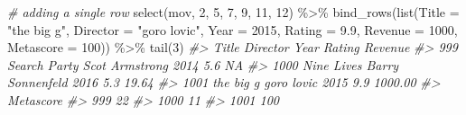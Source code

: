 \documentclass[
]{book}
\newenvironment{Shaded}{\begin{snugshade}}{\end{snugshade}}
\newcommand{\AttributeTok}[1]{\textcolor[rgb]{0.77,0.63,0.00}{#1}}
\newcommand{\CommentTok}[1]{\textcolor[rgb]{0.56,0.35,0.01}{\textit{#1}}}
\newcommand{\DecValTok}[1]{\textcolor[rgb]{0.00,0.00,0.81}{#1}}
\newcommand{\FloatTok}[1]{\textcolor[rgb]{0.00,0.00,0.81}{#1}}
\newcommand{\FunctionTok}[1]{\textcolor[rgb]{0.00,0.00,0.00}{#1}}
\newcommand{\NormalTok}[1]{#1}
\newcommand{\SpecialCharTok}[1]{\textcolor[rgb]{0.00,0.00,0.00}{#1}}
\newcommand{\StringTok}[1]{\textcolor[rgb]{0.31,0.60,0.02}{#1}}
\begin{document}
\begin{Shaded}
\begin{Highlighting}[]
\CommentTok{\# adding a single row}
\FunctionTok{select}\NormalTok{(mov, }\DecValTok{2}\NormalTok{, }\DecValTok{5}\NormalTok{, }\DecValTok{7}\NormalTok{, }\DecValTok{9}\NormalTok{, }\DecValTok{11}\NormalTok{, }\DecValTok{12}\NormalTok{) }\SpecialCharTok{\%\textgreater{}\%}
  \FunctionTok{bind\_rows}\NormalTok{(}\FunctionTok{list}\NormalTok{(}\AttributeTok{Title =} \StringTok{"the big g"}\NormalTok{, }
                 \AttributeTok{Director =} \StringTok{"goro lovic"}\NormalTok{, }
                 \AttributeTok{Year =} \DecValTok{2015}\NormalTok{, }
                 \AttributeTok{Rating =} \FloatTok{9.9}\NormalTok{, }
                 \AttributeTok{Revenue =} \DecValTok{1000}\NormalTok{, }
                 \AttributeTok{Metascore =} \DecValTok{100}\NormalTok{)) }\SpecialCharTok{\%\textgreater{}\%}
\FunctionTok{tail}\NormalTok{(}\DecValTok{3}\NormalTok{)}
\CommentTok{\#\textgreater{}             Title         Director Year Rating Revenue}
\CommentTok{\#\textgreater{} 999  Search Party   Scot Armstrong 2014    5.6      NA}
\CommentTok{\#\textgreater{} 1000   Nine Lives Barry Sonnenfeld 2016    5.3   19.64}
\CommentTok{\#\textgreater{} 1001    the big g       goro lovic 2015    9.9 1000.00}
\CommentTok{\#\textgreater{}      Metascore}
\CommentTok{\#\textgreater{} 999         22}
\CommentTok{\#\textgreater{} 1000        11}
\CommentTok{\#\textgreater{} 1001       100}


\end{Highlighting}
\end{Shaded}
\end{document}
